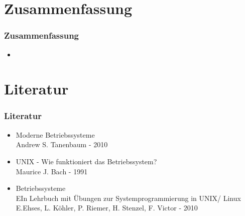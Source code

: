 \documentclass[ddcfooter,nosectionnum]{tudbeamer}
\begin{document}
\section{Zusammenfassung}
\begin{frame}
    \frametitle{Zusammenfassung}
    \begin{itemize}
         \item   
    
    
    
     \end{itemize}
    
\end{frame}


\section{Literatur}
\begin{frame}
    \frametitle{Literatur}
    \begin{itemize}
         \item  Moderne Betriebssysteme \\
        		Andrew S. Tanenbaum - 2010
	\item	 UNIX - Wie funktioniert das Betriebssystem? \\
		Maurice J. Bach - 1991
	\item Betriebssysteme\\
		EIn Lehrbuch mit Übungen zur Systemprogrammierung in UNIX/ Linux \\
		E.Ehses, L. Köhler, P. Riemer, H. Stenzel, F. Victor - 2010	
    \end{itemize}
    
\end{frame}
\end{document}
